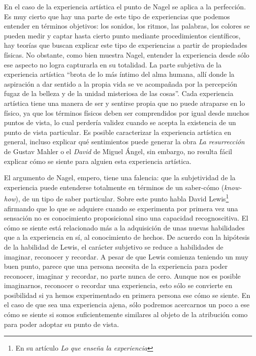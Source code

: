 \documentclass[]{book}
\begin{document}
En el caso de la experiencia artística el punto de Nagel se aplica a la
perfección. Es muy cierto que hay una parte de este tipo de experiencias
que podemos entender en términos objetivos: los sonidos, los ritmos, las
palabras, los colores se pueden medir y captar hasta cierto punto
mediante procedimientos científicos, hay teorías que buscan explicar
este tipo de experiencias a partir de propiedades físicas. No obstante,
como bien muestra Nagel, entender la experiencia desde sólo ese aspecto
no logra capturarla en su totalidad. La parte subjetiva de la
experiencia artística ``brota de lo más íntimo del alma humana, allí
donde la aspiración a dar sentido a la propia vida se ve acompañada por
la percepción fugaz de la belleza y de la unidad misteriosa de las
cosas''. Cada experiencia artística tiene una manera de ser y sentirse
propia que no puede atraparse en lo físico, ya que los términos físicos
deben ser comprendidos por igual desde muchos puntos de vista, lo cual
perdería validez cuando se acepta la existencia de un punto de vista
particular. Es posible caracterizar la experiencia artística en general,
incluso explicar qué sentimientos puede generar la obra \emph{La
resurrección} de Gustav Mahler o el \emph{David} de Miguel Ángel, sin
embargo, no resulta fácil explicar cómo se siente para alguien esta
experiencia artística.

El argumento de Nagel, empero, tiene una falencia: que la subjetividad
de la experiencia puede entenderse totalmente en términos de un
saber-cómo (\emph{know-how}), de un tipo de saber particular. Sobre este
punto habla David Lewis\footnote{En su artículo \emph{Lo que enseña la
  experiencia}} afirmando que lo que se adquiere cuando se experimenta
por primera vez una sensación no es conocimiento proposicional sino una
capacidad recognoscitiva. El cómo se siente está relacionado más a la
adquisición de unas nuevas habilidades que a la experiencia en sí, al
conocimiento de hechos. De acuerdo con la hipótesis de la habilidad de
Lewis, el carácter subjetivo se reduce a habilidades de imaginar,
reconocer y recordar. A pesar de que Lewis comienza teniendo un muy buen
punto, parece que una persona necesita de la experiencia para poder
reconocer, imaginar y recordar, no parte nunca de cero. Aunque nos es
posible imaginarnos, reconocer o recordar una experiencia, esto sólo se
convierte en posibilidad si ya hemos experimentado en primera persona
ese cómo se siente. En el caso de que sea una experiencia ajena, sólo
podremos acercarnos un poco a ese cómo se siente si somos
suficientemente similares al objeto de la atribución como para poder
adoptar su punto de vista.
\end{document}
